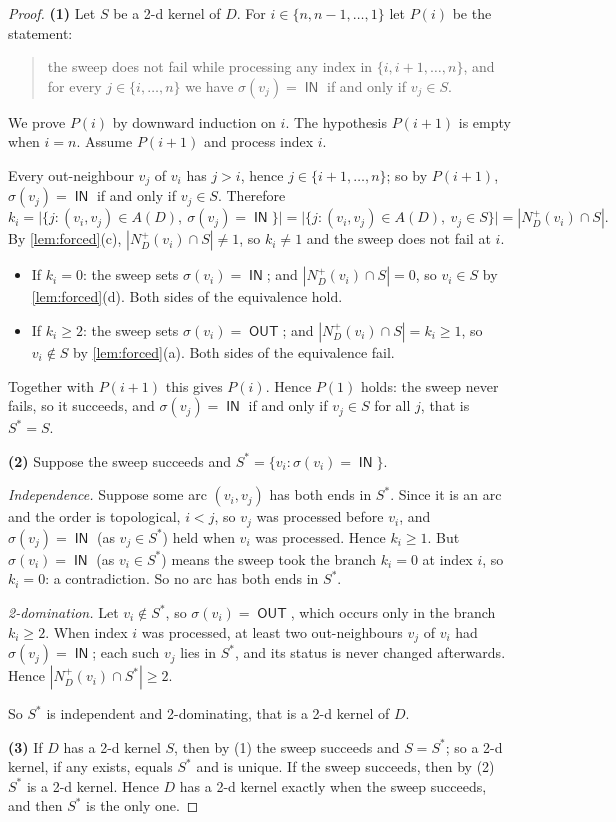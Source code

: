 \documentclass[11pt]{article}
\numberwithin{equation}{section}
\theoremstyle{plain}
\newcommand{\A}{A}
\newcommand{\Np}{N^{+}}
\newcommand{\st}{\sigma}                   %
\DeclareMathOperator{\IN}{\mathsf{IN}}
\DeclareMathOperator{\OUT}{\mathsf{OUT}}
\begin{document}
\begin{proof}
\textbf{(1)} Let $S$ be a 2-d kernel of $D$. For $i\in\{n,n-1,\dots,1\}$ let $P(i)$ be the
statement:
\begin{quote}
the sweep does not fail while processing any index in $\{i,i+1,\dots,n\}$, and for every
$j\in\{i,\dots,n\}$ we have $\st(v_j)=\IN$ if and only if $v_j\in S$.
\end{quote}
We prove $P(i)$ by downward induction on $i$. The hypothesis $P(i+1)$ is empty when
$i=n$. Assume $P(i+1)$ and process index $i$.

Every out-neighbour $v_j$ of $v_i$ has $j>i$, hence $j\in\{i+1,\dots,n\}$; so by
$P(i+1)$, $\st(v_j)=\IN$ if and only if $v_j\in S$. Therefore
\[
  k_i=\bigl|\{j:(v_i,v_j)\in\A(D),\ \st(v_j)=\IN\}\bigr|
     =\bigl|\{j:(v_i,v_j)\in\A(D),\ v_j\in S\}\bigr|
     =|\Np_D(v_i)\cap S|.
\]
By \cref{lem:forced}(c), $|\Np_D(v_i)\cap S|\neq 1$, so $k_i\neq 1$ and the sweep does
not fail at $i$.
\begin{itemize}[leftmargin=1.4em,itemsep=0.3ex]
\item If $k_i=0$: the sweep sets $\st(v_i)=\IN$; and $|\Np_D(v_i)\cap S|=0$, so $v_i\in
S$ by \cref{lem:forced}(d). Both sides of the equivalence hold.
\item If $k_i\ge 2$: the sweep sets $\st(v_i)=\OUT$; and $|\Np_D(v_i)\cap S|=k_i\ge 1$,
so $v_i\notin S$ by \cref{lem:forced}(a). Both sides of the equivalence fail.
\end{itemize}
Together with $P(i+1)$ this gives $P(i)$. Hence $P(1)$ holds: the sweep never fails, so
it succeeds, and $\st(v_j)=\IN$ if and only if $v_j\in S$ for all $j$, that is
$S^\ast=S$.

\textbf{(2)} Suppose the sweep succeeds and $S^\ast=\{v_i:\st(v_i)=\IN\}$.

\emph{Independence.} Suppose some arc $(v_i,v_j)$ has both ends in $S^\ast$. Since it is
an arc and the order is topological, $i<j$, so $v_j$ was processed before $v_i$, and
$\st(v_j)=\IN$ (as $v_j\in S^\ast$) held when $v_i$ was processed. Hence $k_i\ge 1$. But
$\st(v_i)=\IN$ (as $v_i\in S^\ast$) means the sweep took the branch $k_i=0$ at index
$i$, so $k_i=0$: a contradiction. So no arc has both ends in $S^\ast$.

\emph{2-domination.} Let $v_i\notin S^\ast$, so $\st(v_i)=\OUT$, which occurs only in
the branch $k_i\ge 2$. When index $i$ was processed, at least two out-neighbours $v_j$
of $v_i$ had $\st(v_j)=\IN$; each such $v_j$ lies in $S^\ast$, and its status is never
changed afterwards. Hence $|\Np_D(v_i)\cap S^\ast|\ge 2$.

So $S^\ast$ is independent and 2-dominating, that is a 2-d kernel of $D$.

\textbf{(3)} If $D$ has a 2-d kernel $S$, then by (1) the sweep succeeds and $S=S^\ast$;
so a 2-d kernel, if any exists, equals $S^\ast$ and is unique. If the sweep succeeds, then
by (2) $S^\ast$ is a 2-d kernel. Hence $D$ has a 2-d kernel exactly when the sweep succeeds,
and then $S^\ast$ is the only one.
\end{proof}
\end{document}
